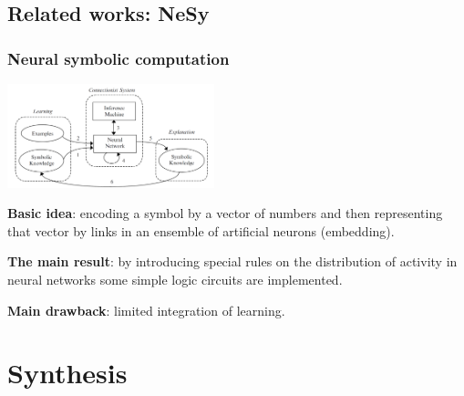 \documentclass[default]{beamer}
\begin{document}
	\subsection{Related works: NeSy}
	\begin{frame}
		\frametitle{Neural symbolic computation}
		
		\begin{center}
			\includegraphics[width=0.45\textwidth]{misc/signs/neuro_symb.png}
		\end{center}
		\textbf{Basic idea}: encoding a symbol by a vector of numbers and then representing that vector by links in an ensemble of artificial neurons (embedding).
		\par\medskip
		\textbf{The main result}: by introducing special rules on the distribution of activity in neural networks some simple logic circuits are implemented.
		\par\medskip
		\textbf{Main drawback}: limited integration of learning.
		
		\nocite{*}
		\printbibliography[keyword={neuro_symb}, resetnumbers=true]
	\end{frame}


	\section{Synthesis}
\end{document}
